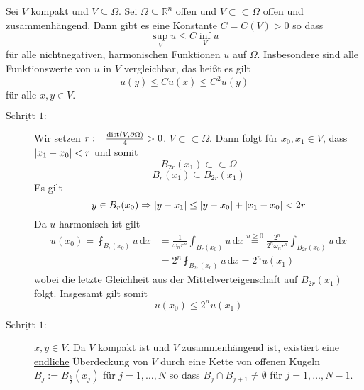 \begin{satz}
	Sei $\overline{V}$ kompakt und $\overline{V} \subseteq \Omega$. Sei $\Omega \subseteq  \mathbb{R}^n$ offen und $V \subset \subset \Omega $ offen und
	zusammenhängend. Dann gibt es eine Konstante $C = C(V) >0$ so dass
	\begin{equation}
		\sup_{V}u \leq C \inf_{V}u
	\end{equation}
	für alle nichtnegativen, harmonischen Funktionen $u$ auf $\Omega$. Insbesondere sind alle Funktionswerte von $u$ in $V$ vergleichbar, das heißt es gilt
	\begin{equation}
		u(y) \leq C u(x) \leq C^2 u(y)
	\end{equation}
	für alle $x,y \in V$.
\end{satz}
\begin{beweis}
	\begin{description}
		\item[$\underline{\text{Schritt }1:}$] Wir setzen $r:= \frac{\operatorname{dist}(V,\partial \Omega)}{4} > 0$. $V \subset \subset \Omega$. Dann folgt für $x_0,x_1 \in V$, dass $\lvert x_1-x_0\rvert< r$ und somit
		\begin{equation}
			B_{2r}(x_1) \subset \subset \Omega 
		\end{equation}
		\begin{equation}
			B_r(x_1) \subseteq B_{2r}(x_1)
		\end{equation}
		Es gilt
		\begin{equation}
			y \in B_r(x_0) \Rightarrow \lvert y-x_1\rvert \leq \lvert y-x_0\rvert + \lvert x_1 - x_0\rvert < 2r
		\end{equation}
		Da $u$ harmonisch ist gilt
		\begin{align*}
			u(x_0) = \fint_{B_r(x_0)}^{} u \,\mathrm{d}x &= \frac{1}{\omega_n r^n} \int_{B_r(x_0)}^{}u\,\mathrm{d}x \stackrel{u \geq 0}{=} \frac{2^n}{2^n \omega_n r^n}
			\int_{B_{2r}(x_0)}^{}u \,\mathrm{d}x \\ &= 2^n \fint_{B_{2r}(x_0)}^{}u \,\mathrm{d}x = 2^n u(x_1)
		\end{align*}
		wobei die letzte Gleichheit aus der Mittelwerteigenschaft auf $B_{2r}(x_1)$ folgt. Insgesamt gilt somit
		\[
			u(x_0) \leq 2^n u(x_1)
		\]
		\item[$\underline{\text{Schritt }1:}$] $x,y \in V$. 
		Da $\bar{V}$ kompakt ist und $V$ zusammenhängend ist, existiert eine \underline{endliche} Überdeckung von $V$ 
		durch eine Kette von offenen Kugeln $B_j := B_{\frac{k}{2}}(x_j)$ für $j=1,\dots,N$ so dass $B_j \cap B_{j+1} \neq \emptyset$ für $j=1,\dots,N-1$.

\end{description}
\end{beweis}
